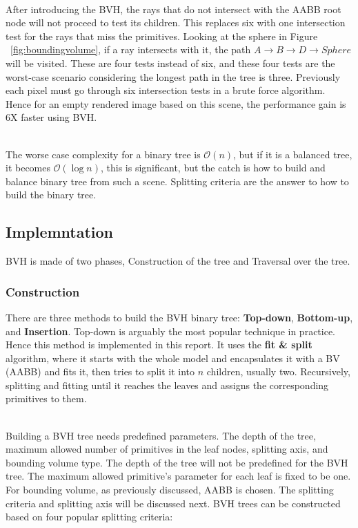 \documentclass[11pt,a4paper]{article}
\begin{document}
\noindent
\\
After introducing the BVH, the rays that do not intersect with the AABB root node will not proceed to test its children. This replaces six with one intersection test for the rays that miss the primitives. Looking at the sphere in Figure ~\ref{fig:boundingvolume}, if a ray intersects with it, the path $A \rightarrow B \rightarrow D \rightarrow Sphere$ will be visited. These are four tests instead of six, and these four tests are the worst-case scenario considering the longest path in the tree is three. Previously each pixel must go through six intersection tests in a brute force algorithm. Hence for an empty rendered image based on this scene, the performance gain is 6X faster using BVH. 

\noindent
\\
The worse case complexity for a binary tree is $\mathcal{O}(n)$, but if it is a balanced tree, it becomes $\mathcal{O}(\log{}n)$, this is significant, but the catch is how to build and balance binary tree from such a scene. Splitting criteria are the answer to how to build the binary tree. 



\subsection{Implemntation}
BVH is made of two phases, Construction of the tree and Traversal over the tree.  

\subsubsection{Construction}
There are three methods to build the BVH binary tree: \textbf{Top-down}, \textbf{Bottom-up}, and \textbf{Insertion}. Top-down is arguably the most popular technique in practice. Hence this method is implemented in this report. It uses the \textbf{fit \& split} algorithm, where it starts with the whole model and encapsulates it with a BV (AABB) and fits it, then tries to split it into $n$ children, usually two. Recursively, splitting and fitting until it reaches the leaves and assigns the corresponding primitives to them.


\noindent
\\
Building a BVH tree needs predefined parameters. The depth of the tree, maximum allowed number of primitives in the leaf nodes, splitting axis, and bounding volume type. The depth of the tree will not be predefined for the BVH tree. The maximum allowed primitive's parameter for each leaf is fixed to be one. For bounding volume, as previously discussed,  AABB is chosen. The splitting criteria and splitting axis will be discussed next. BVH trees can be constructed based on four popular splitting criteria:
\end{document}
